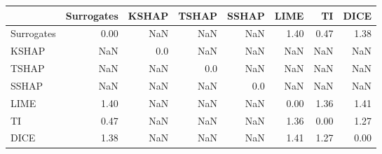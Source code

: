 \begin{tabular}{lrrrrrrr}
\toprule
{} &  Surrogates &  KSHAP &  TSHAP &  SSHAP &  LIME &    TI &  DICE \\
\midrule
Surrogates &        0.00 &    NaN &    NaN &    NaN &  1.40 &  0.47 &  1.38 \\
KSHAP      &         NaN &    0.0 &    NaN &    NaN &   NaN &   NaN &   NaN \\
TSHAP      &         NaN &    NaN &    0.0 &    NaN &   NaN &   NaN &   NaN \\
SSHAP      &         NaN &    NaN &    NaN &    0.0 &   NaN &   NaN &   NaN \\
LIME       &        1.40 &    NaN &    NaN &    NaN &  0.00 &  1.36 &  1.41 \\
TI         &        0.47 &    NaN &    NaN &    NaN &  1.36 &  0.00 &  1.27 \\
DICE       &        1.38 &    NaN &    NaN &    NaN &  1.41 &  1.27 &  0.00 \\
\bottomrule
\end{tabular}
